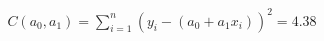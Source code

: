 \documentclass[preview]{standalone}
\begin{document}
\begin{align*}
C(a_0, a_1) = \sum_{i=1}^{n} (y_i - (a_0 + a_1x_i))^2 =4.38
\end{align*}
\end{document}
